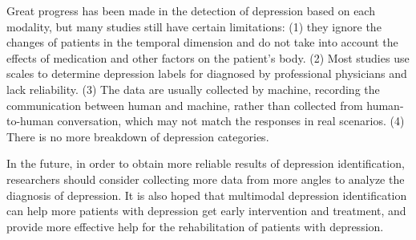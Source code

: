 Great progress has been made in the detection of depression based on each modality, but many studies still have certain limitations: (1) they ignore the changes of patients in the temporal dimension and do not take into account the effects of medication and other factors on the patient's body. (2) Most studies use scales to determine depression labels for diagnosed by professional physicians and lack reliability. (3) The data are usually collected by machine, recording the communication between human and machine, rather than collected from human-to-human conversation, which may not match the responses in real scenarios. (4) There is no more breakdown of depression categories.

In the future, in order to obtain more reliable results of depression identification, researchers should consider collecting more data from more angles to analyze the diagnosis of depression. It is also hoped that multimodal depression identification can help more patients with depression get early intervention and treatment, and provide more effective help for the rehabilitation of patients with depression.




\ifx\allfiles\undefined

\fi

